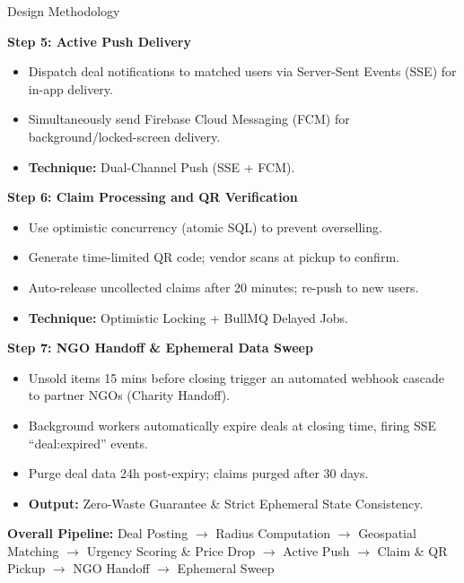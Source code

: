 \documentclass[aspectratio=169,xcolor=dvipsnames]{beamer}
\begin{document}
\begin{frame}{Design Methodology}
\justifying

\textbf{Step 5: Active Push Delivery}
\begin{itemize}
    \item Dispatch deal notifications to matched users via Server-Sent Events (SSE) for in-app delivery.
    \item Simultaneously send Firebase Cloud Messaging (FCM) for background/locked-screen delivery.
    \item \textbf{Technique:} Dual-Channel Push (SSE + FCM).
\end{itemize}

\vspace{0.15cm}

\textbf{Step 6: Claim Processing and QR Verification}
\begin{itemize}
    \item Use optimistic concurrency (atomic SQL) to prevent overselling.
    \item Generate time-limited QR code; vendor scans at pickup to confirm.
    \item Auto-release uncollected claims after 20 minutes; re-push to new users.
    \item \textbf{Technique:} Optimistic Locking + BullMQ Delayed Jobs.
\end{itemize}

\vspace{0.15cm}

\textbf{Step 7: NGO Handoff \& Ephemeral Data Sweep}
\begin{itemize}
    \item Unsold items 15 mins before closing trigger an automated webhook cascade to partner NGOs (Charity Handoff).
    \item Background workers automatically expire deals at closing time, firing SSE ``deal:expired'' events.
    \item Purge deal data 24h post-expiry; claims purged after 30 days.
    \item \textbf{Output:} Zero-Waste Guarantee \& Strict Ephemeral State Consistency.
\end{itemize}

\vspace{0.2cm}

\textbf{Overall Pipeline:}
Deal Posting $\rightarrow$ Radius Computation $\rightarrow$
Geospatial Matching $\rightarrow$ Urgency Scoring \& Price Drop $\rightarrow$
Active Push $\rightarrow$ Claim \& QR Pickup $\rightarrow$ NGO Handoff $\rightarrow$ Ephemeral Sweep

\end{frame}
\end{document}
